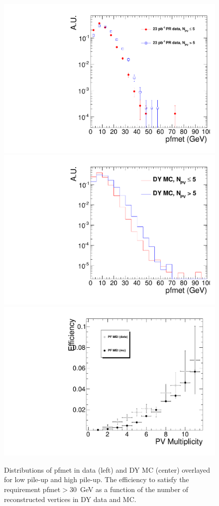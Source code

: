 

\begin{figure}[hbt]
\begin{center}
\includegraphics[width=0.3\linewidth]{figures/pfmet_data.pdf} 
\includegraphics[width=0.3\linewidth]{figures/pfmet_dymc.pdf}
\includegraphics[width=0.3\linewidth]{figures/pfmet_Eff30.pdf} 
\caption{\label{fig:met_pu}\protect Distributions of pfmet in data (left) and DY MC (center) 
overlayed for low pile-up and high pile-up. The efficiency to satisfy the requirement pfmet$>30$~GeV as a function
of the number of reconstructed vertices in DY data and MC.}
\end{center}
\end{figure}

